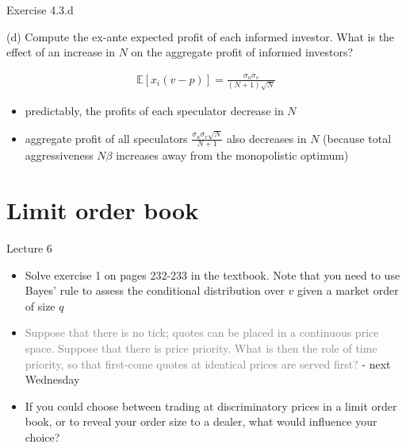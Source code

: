 \documentclass[english,10pt
,aspectratio=169
]{beamer}
\begin{document}


\begin{frame}{Exercise 4.3.d}
	\begin{exampleblock}{}
		(d) Compute the ex-ante expected profit of each informed investor. What is the effect of an increase in $N$ on the aggregate profit of informed investors?
	\end{exampleblock}

	\pause
	
	\begin{align*}
		\mathbb{E} [x_i(v-p)] = \frac{\sigma_u \sigma_v}{(N+1) \sqrt{N}}
	\end{align*}
	\begin{itemize}
		\item predictably, the profits of each speculator decrease in $N$
		\item aggregate profit of all speculators $\frac{\sigma_u \sigma_v \sqrt{N}}{N+1}$ also decreases in $N$ (because total aggressiveness $N \beta$ increases away from the monopolistic optimum)
	\end{itemize}
\end{frame}




\section{Limit order book}

\begin{frame}{Lecture 6}
	\begin{itemize}
		\item Solve exercise 1 on pages 232-233 in the textbook. Note that you need to use Bayes' rule to assess the conditional distribution over $v$ given a market order of size $q$
		\item \textcolor{gray}{Suppose that there is no tick; quotes can be placed in a continuous price space. Suppose that there is price priority. What is then the role of time priority, so that first-come quotes at identical prices are served first?} - next Wednesday
		\item If you could choose between trading at discriminatory prices in a limit order book, or to reveal your order size to a dealer, what would influence your choice?
	\end{itemize}
\end{frame}
\end{document}
